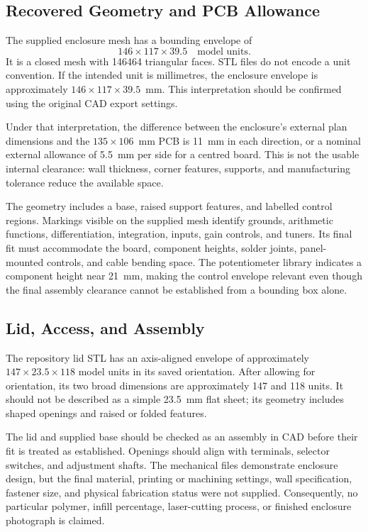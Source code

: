 \documentclass[11pt,a4paper]{article}
\begin{document}
\subsection{Recovered Geometry and PCB Allowance}
The supplied enclosure mesh has a bounding envelope of
\begin{equation}
146\times117\times39.5\quad\text{model units}.
\end{equation}
It is a closed mesh with 146464 triangular faces. STL files do not encode a unit convention. If the intended unit is millimetres, the enclosure envelope is approximately $146\times117\times39.5$~mm. This interpretation should be confirmed using the original CAD export settings.

Under that interpretation, the difference between the enclosure's external plan dimensions and the $135\times106$~mm PCB is 11~mm in each direction, or a nominal external allowance of 5.5~mm per side for a centred board. This is not the usable internal clearance: wall thickness, corner features, supports, and manufacturing tolerance reduce the available space.

The geometry includes a base, raised support features, and labelled control regions. Markings visible on the supplied mesh identify grounds, arithmetic functions, differentiation, integration, inputs, gain controls, and tuners. Its final fit must accommodate the board, component heights, solder joints, panel-mounted controls, and cable bending space. The potentiometer library indicates a component height near 21~mm, making the control envelope relevant even though the final assembly clearance cannot be established from a bounding box alone.

\subsection{Lid, Access, and Assembly}
The repository lid STL has an axis-aligned envelope of approximately $147\times23.5\times118$ model units in its saved orientation. After allowing for orientation, its two broad dimensions are approximately 147 and 118 units. It should not be described as a simple 23.5~mm flat sheet; its geometry includes shaped openings and raised or folded features.

The lid and supplied base should be checked as an assembly in CAD before their fit is treated as established. Openings should align with terminals, selector switches, and adjustment shafts. The mechanical files demonstrate enclosure design, but the final material, printing or machining settings, wall specification, fastener size, and physical fabrication status were not supplied. Consequently, no particular polymer, infill percentage, laser-cutting process, or finished enclosure photograph is claimed.
\end{document}
